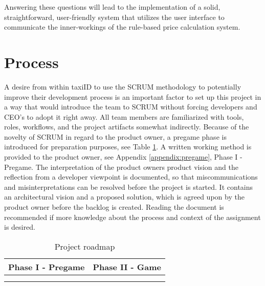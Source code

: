 Answering these questions will lead to the implementation of a solid, straightforward, user-friendly system that utilizes the user interface to communicate the inner-workings of the rule-based price calculation system.

%
\section{Process}
A desire from within taxiID to use the SCRUM methodology to potentially improve their development process is an important factor to set up this project in a way that would introduce the team to SCRUM without forcing developers and CEO's to adopt it right away. All team members are familiarized with tools, roles, workflows, and the project artifacts somewhat indirectly. Because of the novelty of SCRUM in regard to the product owner, a pregame phase is introduced for preparation purposes, see Table \ref{tab:planning}. A written working method is provided to the product owner, see Appendix \ref{appendix:pregame}, Phase I - Pregame. The interpretation of the product owners product vision and the reflection from a developer viewpoint is documented, so that miscommunications and misinterpretations can be resolved before the project is started. It contains an architectural vision and a proposed solution, which is agreed upon by the product owner before the backlog is created. Reading the document is recommended if more knowledge about the process and context of the assignment is desired.

\begin{table}[htbp!]
	\centering
	\begin{tabular}{ccc|c|c|c|c|c|c|c|c}
		\toprule
		\multicolumn{3}{c}{Phase I - Pregame}   &
		\multicolumn{8}{c}{Phase II - Game}  		\\
		\midrule
		\rotate{week 1}                         &
		\rotate{week 2}                         &
		\rotate{week 3}                         &
		\rotate{week 4}                         &
		\rotate{week 5}                         &
		\rotate{week 6}                         &
		\rotate{week 7}                         &
		\rotate{week 8}                         &
		\rotate{week 9}                         &
		\rotate{week 10}                        &
		\rotate{week 11}                        \\
		\midrule
		\rotate{product definition}     				&
		\rotate{architectural vision} 					&
		\rotate{proposed solution}							&
		\rotate{sprint 1}                       &
		\rotate{sprint 2}                       &
		\rotate{sprint 3}                       &
		\rotate{sprint 4}                       &
		\rotate{sprint 5}                       &
		\rotate{sprint 6}                       &
		\rotate{sprint 7}                       &
		\rotate{sprint 8}                       \\
		\bottomrule
	\end{tabular}
	\caption[Planning]{Project roadmap}
	\label{tab:planning}
\end{table}
